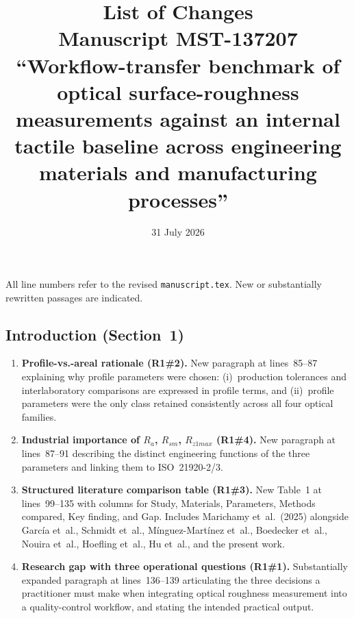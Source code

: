 \documentclass[10pt]{article}
\begin{document}
\title{List of Changes \\
Manuscript MST-137207 \\
{\normalsize ``Workflow-transfer benchmark of optical surface-roughness measurements against an internal tactile baseline across engineering materials and manufacturing processes''}}

\date{31 July 2026}
\maketitle

\noindent All line numbers refer to the revised \texttt{manuscript.tex}. New or substantially rewritten passages are indicated.

\subsection*{Introduction (Section~1)}

\begin{enumerate}[leftmargin=*, label=\textbf{C\arabic*.}, ref=C\arabic*]

\item \textbf{Profile-vs.-areal rationale (R1\#2).} New paragraph at lines~85--87 explaining why profile parameters were chosen: (i)~production tolerances and interlaboratory comparisons are expressed in profile terms, and (ii)~profile parameters were the only class retained consistently across all four optical families.

\item \textbf{Industrial importance of $R_a$, $R_{sm}$, $R_{z1max}$ (R1\#4).} New paragraph at lines~87--91 describing the distinct engineering functions of the three parameters and linking them to ISO~21920-2/3.

\item \textbf{Structured literature comparison table (R1\#3).} New Table~1 at lines~99--135 with columns for Study, Materials, Parameters, Methods compared, Key finding, and Gap. Includes Marichamy et~al.\ (2025) alongside Garc\'ia et~al., Schmidt et~al., M\'inguez-Mart\'inez et~al., Boedecker et~al., Nouira et~al., Hoefling et~al., Hu et~al., and the present work.

\item \textbf{Research gap with three operational questions (R1\#1).} Substantially expanded paragraph at lines~136--139 articulating the three decisions a practitioner must make when integrating optical roughness measurement into a quality-control workflow, and stating the intended practical output.

\end{enumerate}
\end{document}
